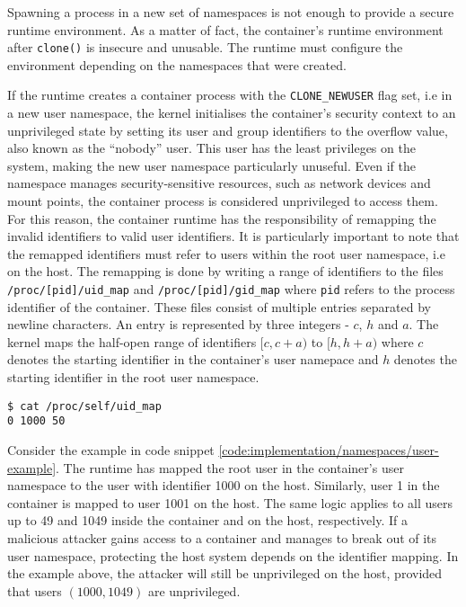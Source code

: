 Spawning a process in a new set of namespaces is not enough to provide a secure runtime environment.
As a matter of fact, the container's runtime environment after \verb|clone()| is insecure and unusable.
The runtime must configure the environment depending on the namespaces that were created.  

If the runtime creates a container process with the \verb|CLONE_NEWUSER| flag set, i.e in a new user namespace,
the kernel initialises the container's security context to an unprivileged state by setting its 
user and group identifiers to the overflow value, also known as the \enquote{nobody} user.
This user has the least privileges on the system, making the new user namespace particularly unuseful. 
Even if the namespace manages security-sensitive resources, such as network devices and mount points,
the container process is considered unprivileged to access them. For this reason, the container runtime 
has the responsibility of remapping the invalid identifiers to valid user identifiers. 
It is particularly important to note that the remapped identifiers must refer to users within 
the root user namespace, i.e on the host. The remapping is done by writing a range of 
identifiers to the files \verb|/proc/[pid]/uid_map| and \verb|/proc/[pid]/gid_map| where \verb|pid|
refers to the process identifier of the container.
These files consist of multiple entries separated by newline characters. 
An entry is represented by three integers - $c$, $h$ and $a$. 
The kernel maps the half-open range of identifiers $[c, c+a)$ to $[h, h+a)$ where 
$c$ denotes the starting identifier in the container's user namepace and $h$ denotes 
the starting identifier in the root user namespace.
\begin{lstlisting}[label={code:implementation/namespaces/user-example}, style=bash, caption={Example of an identifier mapping}]
$ cat /proc/self/uid_map
0 1000 50
\end{lstlisting}
Consider the example in code snippet \ref{code:implementation/namespaces/user-example}. The 
runtime has mapped the root user in the container's user namespace to the user with identifier 1000 
on the host. Similarly, user 1 in the container is mapped to user 1001 on the host. The same logic 
applies to all users up to 49 and 1049 inside the container and on the host, respectively. 
If a malicious attacker gains access to a container and manages to break out of its user namespace, 
protecting the host system depends on the identifier mapping. In the example above, the 
attacker will still be unprivileged on the host, provided that users $(1000, 1049)$ are unprivileged.
